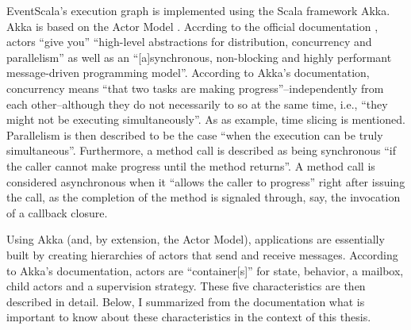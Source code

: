 \documentclass[article, type=bsc, colorback, accentcolor=tud8b, parskip=half, bibliography=totocnumbered]{tudthesis}
\begin{document}
EventScala's execution graph is implemented using the Scala framework Akka.
Akka is based on the Actor Model \cite{Hewitt:1973:UMA:1624775.1624804}.
Accrding to the official documentation \cite{akka}, actors ``give you'' ``high-level abstractions for distribution, concurrency and parallelism'' as well as an ``[a]synchronous, non-blocking and highly performant message-driven programming model''.
According to Akka's documentation, concurrency means ``that two tasks are making progress''--independently from each other--although they do not necessarily to so at the same time, i.e., ``they might not be executing simultaneously''.
As as example, time slicing is mentioned.
Parallelism is then described to be the case ``when the execution can be truly simultaneous''.
Furthermore, a method call is described as being synchronous ``if the caller cannot make progress until the method returns''.
A method call is considered asynchronous when it ``allows the caller to progress'' right after issuing the call, as the completion of the method is signaled through, say, the invocation of a callback closure.

Using Akka (and, by extension, the Actor Model), applications are essentially built by creating hierarchies of actors that send and receive messages.
According to Akka's documentation, actors are ``container[s]'' for state, behavior, a mailbox, child actors and a supervision strategy.
These five characteristics are then described in detail.
Below, I summarized from the documentation what is important to know about these characteristics in the context of this thesis.
\end{document}
